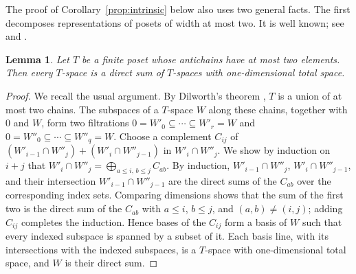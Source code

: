 \documentclass[a4paper,reqno,10pt]{amsart}
\newtheorem{lemma}[theorem]{Lemma}
\theoremstyle{definition}
\numberwithin{equation}{section}
\begin{document}
The proof of Corollary~\ref{prop:intrinsic} below also uses two general
facts. The first decomposes representations of posets of width at most
two. It is well known; see
\cite[Section~8, Remark, p.~237]{RV} and
\cite[Section~5.2, Corollary]{GR}.
\begin{lemma}\label{lem:two-chains}
Let \(T\) be a finite poset whose antichains have at most two elements.
Then every \(T\)-space is a direct sum of \(T\)-spaces with
one-dimensional total space.
\end{lemma}
\begin{proof}
We recall the usual argument. By Dilworth's theorem \cite{Dilworth}, \(T\)
is a union of at most two chains. The subspaces of a \(T\)-space \(W\)
along these chains, together with \(0\) and \(W\), form two filtrations
\(0=W'_0\subseteq\cdots\subseteq W'_r=W\) and
\(0=W''_0\subseteq\cdots\subseteq W''_q=W\). Choose a complement
\(C_{ij}\) of \((W'_{i-1}\cap W''_j)+(W'_i\cap W''_{j-1})\) in
\(W'_i\cap W''_j\). We show by induction on \(i+j\) that
\(W'_i\cap W''_j=\bigoplus_{a\leq i,\,b\leq j}C_{ab}\). By induction,
\(W'_{i-1}\cap W''_j\), \(W'_i\cap W''_{j-1}\), and their intersection
\(W'_{i-1}\cap W''_{j-1}\) are the direct sums of the \(C_{ab}\) over the
corresponding index sets. Comparing dimensions shows that the sum of the
first two is the direct sum of the \(C_{ab}\) with \(a\leq i\),
\(b\leq j\), and \((a,b)\ne(i,j)\); adding \(C_{ij}\) completes the
induction. Hence bases of the
\(C_{ij}\) form a basis of \(W\) such that every indexed subspace is
spanned by a subset of it. Each basis line, with its intersections with
the indexed subspaces, is a \(T\)-space with one-dimensional total space,
and \(W\) is their direct sum.
\end{proof}
\end{document}

